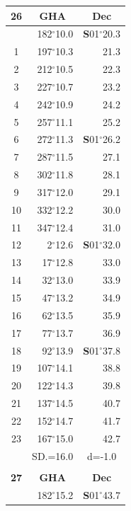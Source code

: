 \documentclass[10pt, a4paper]{report}
\begin{document}
\begin{scriptsize}
\begin{tabular*}{0.2\textwidth}[t]{@{\extracolsep{\fill}}|c|rr|}
\hline
\multicolumn{1}{|c|}{\rule{0pt}{2.6ex}\textbf{26}} & \multicolumn{1}{c}{\textbf{GHA}} & \multicolumn{1}{c|}{\textbf{Dec}}\\
\hline\rule{0pt}{2.6ex}\noindent
0 & 182$^\circ$10.0 & \textbf{S}01$^\circ$20.3\\
1 & 197$^\circ$10.3 & 21.3\\
2 & 212$^\circ$10.5 & 22.3\\
3 & 227$^\circ$10.7 & \raisebox{0.24ex}{\boldmath$\cdot$~\boldmath$\cdot$~~}23.2\\
4 & 242$^\circ$10.9 & 24.2\\
5 & 257$^\circ$11.1 & 25.2\\[2Pt]
6 & 272$^\circ$11.3 & \textbf{S}01$^\circ$26.2\\
7 & 287$^\circ$11.5 & 27.1\\
8 & 302$^\circ$11.8 & 28.1\\
9 & 317$^\circ$12.0 & \raisebox{0.24ex}{\boldmath$\cdot$~\boldmath$\cdot$~~}29.1\\
10 & 332$^\circ$12.2 & 30.0\\
11 & 347$^\circ$12.4 & 31.0\\[2Pt]
12 & 2$^\circ$12.6 & \textbf{S}01$^\circ$32.0\\
13 & 17$^\circ$12.8 & 33.0\\
14 & 32$^\circ$13.0 & 33.9\\
15 & 47$^\circ$13.2 & \raisebox{0.24ex}{\boldmath$\cdot$~\boldmath$\cdot$~~}34.9\\
16 & 62$^\circ$13.5 & 35.9\\
17 & 77$^\circ$13.7 & 36.9\\[2Pt]
18 & 92$^\circ$13.9 & \textbf{S}01$^\circ$37.8\\
19 & 107$^\circ$14.1 & 38.8\\
20 & 122$^\circ$14.3 & 39.8\\
21 & 137$^\circ$14.5 & \raisebox{0.24ex}{\boldmath$\cdot$~\boldmath$\cdot$~~}40.7\\
22 & 152$^\circ$14.7 & 41.7\\
23 & 167$^\circ$15.0 & 42.7\\
\hline
\rule{0pt}{2.4ex} & \multicolumn{1}{c}{SD.=16.0} & \multicolumn{1}{c|}{d=-1.0}\\
\hline
\multicolumn{1}{c}{}\\[-0.5ex]\hline
\multicolumn{1}{|c|}{\rule{0pt}{2.6ex}\textbf{27}} & \multicolumn{1}{c}{\textbf{GHA}} & \multicolumn{1}{c|}{\textbf{Dec}}\\
\hline\rule{0pt}{2.6ex}\noindent
0 & 182$^\circ$15.2 & \textbf{S}01$^\circ$43.7\\

\end{tabular*}
\end{scriptsize}
\end{document}
